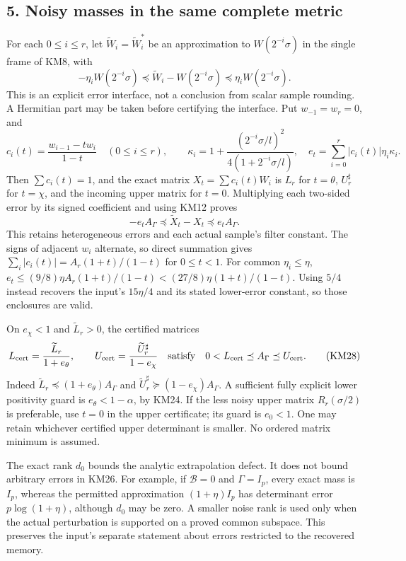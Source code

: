 \documentclass[11pt]{article}
\begin{document}
\subsection{5. Noisy masses in the same complete metric}\label{noisy-masses-in-the-same-complete-metric}

For each \(0\le i\le r\), let \(\widetilde W_i=\widetilde W_i^*\) be an approximation to \(W(2^{-i}\sigma)\) in the single frame of KM8, with \[
 -\eta_iW(2^{-i}\sigma)\preceq
 \widetilde W_i-W(2^{-i}\sigma)\preceq
 \eta_iW(2^{-i}\sigma).
 \tag{KM26}
\] This is an explicit error interface, not a conclusion from scalar sample rounding. A Hermitian part may be taken before certifying the interface. Put \(w_{-1}=w_r=0\), and \[
 c_i(t)=\frac{w_{i-1}-t w_i}{1-t}\quad(0\le i\le r),\qquad
 \kappa_i=1+\frac{(2^{-i}\sigma/l)^2}{4(1+2^{-i}\sigma/l)},\quad
 e_t=\sum_{i=0}^{r}|c_i(t)|\eta_i\kappa_i .
\] Then \(\sum c_i(t)=1\), and the exact matrix \(X_t=\sum c_i(t)W_i\) is \(L_r\) for \(t=\theta\), \(U_r^\sharp\) for \(t=\chi\), and the incoming upper matrix for \(t=0\). Multiplying each two-sided error by its signed coefficient and using KM12 proves \[
 -e_tA_\Gamma\preceq\widetilde X_t-X_t\preceq e_tA_\Gamma .
 \tag{KM27}
\] This retains heterogeneous errors and each actual sample's filter constant. The signs of adjacent \(w_i\) alternate, so direct summation gives \(\sum_i|c_i(t)|=A_r(1+t)/(1-t)\) for \(0\le t<1\). For common \(\eta_i\le\eta\), \(e_t\le(9/8)\eta A_r(1+t)/(1-t)<(27/8)\eta(1+t)/(1-t)\). Using \(5/4\) instead recovers the input's \(15\eta/4\) and its stated lower-error constant, so those enclosures are valid.

On \(e_\chi<1\) and \(\widetilde L_r>0\), the certified matrices \[
 L_{\rm cert}=\frac{\widetilde L_r}{1+e_\theta},
 \qquad U_{\rm cert}=\frac{\widetilde U_r^\sharp}{1-e_\chi}
 \quad\text{satisfy}\quad
 0<L_{\rm cert}\preceq A_\Gamma\preceq U_{\rm cert}.
 \tag{KM28}
\] Indeed \(\widetilde L_r\preceq(1+e_\theta)A_\Gamma\) and \(\widetilde U_r^\sharp\succeq(1-e_\chi)A_\Gamma\). A sufficient fully explicit lower positivity guard is \(e_\theta<1-\alpha\), by KM24. If the less noisy upper matrix \(R_r(\sigma/2)\) is preferable, use \(t=0\) in the upper certificate; its guard is \(e_0<1\). One may retain whichever certified upper determinant is smaller. No ordered matrix minimum is assumed.

The exact rank \(d_0\) bounds the analytic extrapolation defect. It does not bound arbitrary errors in KM26. For example, if \(\mathcal B=0\) and \(\Gamma=I_p\), every exact mass is \(I_p\), whereas the permitted approximation \((1+\eta)I_p\) has determinant error \(p\log(1+\eta)\), although \(d_0\) may be zero. A smaller noise rank is used only when the actual perturbation is supported on a proved common subspace. This preserves the input's separate statement about errors restricted to the recovered memory.
\end{document}
